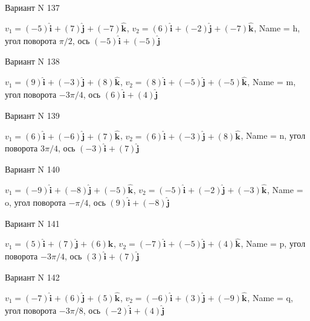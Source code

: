 \documentclass[11pt]{report}
\begin{document}
Вариант N 137

$v_1 = \left(-5\right)\mathbf{\hat{i}_{}} + \left(7\right)\mathbf{\hat{j}_{}} + \left(-7\right)\mathbf{\hat{k}_{}}$, $v_2 = \left(6\right)\mathbf{\hat{i}_{}} + \left(-2\right)\mathbf{\hat{j}_{}} + \left(-7\right)\mathbf{\hat{k}_{}}$, Name = h, угол поворота $\pi / 2$, ось $\left(-5\right)\mathbf{\hat{i}_{}} + \left(-5\right)\mathbf{\hat{j}_{}}$

Вариант N 138

$v_1 = \left(9\right)\mathbf{\hat{i}_{}} + \left(-3\right)\mathbf{\hat{j}_{}} + \left(8\right)\mathbf{\hat{k}_{}}$, $v_2 = \left(8\right)\mathbf{\hat{i}_{}} + \left(-5\right)\mathbf{\hat{j}_{}} + \left(-5\right)\mathbf{\hat{k}_{}}$, Name = m, угол поворота $- 3 \pi / 4$, ось $\left(6\right)\mathbf{\hat{i}_{}} + \left(4\right)\mathbf{\hat{j}_{}}$

Вариант N 139

$v_1 = \left(6\right)\mathbf{\hat{i}_{}} + \left(-6\right)\mathbf{\hat{j}_{}} + \left(7\right)\mathbf{\hat{k}_{}}$, $v_2 = \left(6\right)\mathbf{\hat{i}_{}} + \left(-3\right)\mathbf{\hat{j}_{}} + \left(8\right)\mathbf{\hat{k}_{}}$, Name = n, угол поворота $3 \pi / 4$, ось $\left(-3\right)\mathbf{\hat{i}_{}} + \left(7\right)\mathbf{\hat{j}_{}}$

Вариант N 140

$v_1 = \left(-9\right)\mathbf{\hat{i}_{}} + \left(-8\right)\mathbf{\hat{j}_{}} + \left(-5\right)\mathbf{\hat{k}_{}}$, $v_2 = \left(-5\right)\mathbf{\hat{i}_{}} + \left(-2\right)\mathbf{\hat{j}_{}} + \left(-3\right)\mathbf{\hat{k}_{}}$, Name = o, угол поворота $- \pi / 4$, ось $\left(9\right)\mathbf{\hat{i}_{}} + \left(-8\right)\mathbf{\hat{j}_{}}$

Вариант N 141

$v_1 = \left(5\right)\mathbf{\hat{i}_{}} + \left(7\right)\mathbf{\hat{j}_{}} + \left(6\right)\mathbf{\hat{k}_{}}$, $v_2 = \left(-7\right)\mathbf{\hat{i}_{}} + \left(-5\right)\mathbf{\hat{j}_{}} + \left(4\right)\mathbf{\hat{k}_{}}$, Name = p, угол поворота $- 3 \pi / 4$, ось $\left(3\right)\mathbf{\hat{i}_{}} + \left(7\right)\mathbf{\hat{j}_{}}$

Вариант N 142

$v_1 = \left(-7\right)\mathbf{\hat{i}_{}} + \left(6\right)\mathbf{\hat{j}_{}} + \left(5\right)\mathbf{\hat{k}_{}}$, $v_2 = \left(-6\right)\mathbf{\hat{i}_{}} + \left(3\right)\mathbf{\hat{j}_{}} + \left(-9\right)\mathbf{\hat{k}_{}}$, Name = q, угол поворота $- 3 \pi / 8$, ось $\left(-2\right)\mathbf{\hat{i}_{}} + \left(4\right)\mathbf{\hat{j}_{}}$
\end{document}
